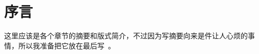 \chapter{序言} \label{pre}

\begin{kaitext}
这里应该是各个章节的摘要和版式简介，不过因为写摘要向来是件让人心烦的事情，所以我准备把它放在最后写~\smiley。

\danger\\\enddanger
\ddanger\\\enddanger
\end{kaitext}